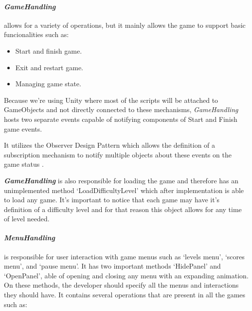 \newpage
\paragraph{\textit{GameHandling}} allows for a variety of operations, but it mainly allows the game to support basic funcionalities such as:

\vspace{-\topsep}  %
\begin{itemize}
    \setlength{\itemsep}{8pt}  %
    \setlength{\parskip}{0pt}  %
    \item Start and finish game.
    \item Exit and restart game.
    \item Managing game state.
\end{itemize}
\vspace{-\topsep}  %

Because we're using Unity where most of the scripts will be attached to GameObjects and not directly connected to these mechanisms, \textit{GameHandling} hosts two separate events capable of notifying components of Start and Finish game events.

It utilizes the Observer Design Pattern \cite{observer} which allows the definition of a subscription mechanism to notify multiple objects about these events on the game status \cite{gamma1994design}.

\textbf{\textit{GameHandling}} is also responsible for loading the game and therefore has an unimplemented method `LoadDifficultyLevel' which after implementation is able to load any game. It's important to notice that each game may have it's definition of a difficulty level and for that reason this object allows for any time of level needed.\\

\paragraph{\textit{MenuHandling}} is responsible for user interaction with game menus such as `levels menu', `scores menu', and `pause menu'. It has two important methods `HidePanel' and `OpenPanel', able of opening and closing any menu with an expanding animation. On these methods, the developer should specify all the menus and interactions they should have. It contains several operations that are present in all the games such as:

